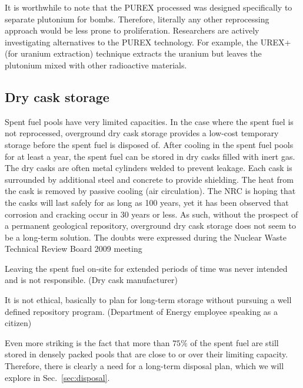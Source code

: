 \documentclass[nofootinbib,preprint,aps]{revtex4-1}
\begin{document}
    It is worthwhile to note that the PUREX processed was designed specifically to separate plutonium for
    bombs. Therefore, literally any other reprocessing approach would be less prone to proliferation.
    Researchers are actively investigating alternatives to the PUREX technology. For example, the UREX+ (for
    uranium extraction) technique extracts the uranium but leaves the plutonium mixed with other
    radioactive materials.\cite{aa12}

    \subsection{Dry cask storage}
    Spent fuel pools have very limited capacities. 
    In the case where the spent fuel is not reprocessed, overground dry cask storage provides a low-cost temporary storage before the spent fuel is disposed of.
    After cooling in the spent fuel pools for at least a year, the spent fuel can be stored in dry casks filled with inert gas. 
The dry casks are often metal cylinders welded to prevent leakage. Each cask is surrounded by
    additional steel and concrete to provide shielding.
    The heat from the cask is removed by passive
    cooling (air circulation). The NRC is hoping that the casks will
    last safely for as long as 100 years, yet it has been observed that corrosion and cracking occur in 30 years
    or less.\cite{aa12} As such, without the prospect of a permanent geological repository,
    overground dry cask storage does not seem to be a long-term solution. The doubts were expressed
    during the Nuclear Waste Technical Review Board 2009 meeting \cite{nwtb09, aa12}
    \begin{displayquote}
    Leaving the spent fuel on-site for extended periods of time was never intended and is not
    responsible. (Dry cask manufacturer)

    It is not ethical, basically to plan for long-term storage without pursuing a well defined repository
    program. (Department of Energy employee speaking as a citizen)
    \end{displayquote}
    Even more striking is the fact that more than $75\%$ of the spent fuel are still stored in densely
    packed pools
    that are close to or over their limiting capacity.\cite{a11,aa12}
    Therefore, there is clearly a need for a long-term disposal plan, which we will explore in
    Sec.~\ref{sec:disposal}.
\end{document}
